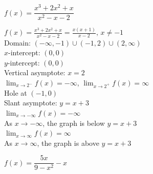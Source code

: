 \documentclass{ximera}
\begin{document}
\begin{question}
\begin{problem}
\begin{solution}
\begin{center} 
\end{center}
\end{solution}
\end{problem} 

\begin{problem}
$f(x) = \dfrac{x^3+2x^2+x}{x^2-x-2}$

\begin{solution}
$f(x) = \frac{x^3+2x^2+x}{x^{2} -x-2} = \frac{x(x+1)}{x - 2}, \, x \neq -1$\\
Domain: $(-\infty, -1) \cup (-1, 2) \cup (2, \infty)$\\
$x$-intercept:  $(0,0)$\\
$y$-intercept:  $(0,0)$\\
Vertical asymptote: $x = 2$\\
$\lim_{x \rightarrow 2^{-}} f(x) = -\infty$, $\lim_{x \rightarrow 2^{+}} f(x) = \infty$\\
Hole at $(-1,0)$ \\
Slant asymptote: $y = x+3$ \\
$\lim_{x \rightarrow -\infty} f(x) = -\infty$\\
As $x \rightarrow -\infty$, the graph is below $y=x+3$ \\
$\lim_{x \rightarrow \infty} f(x) = \infty$\\
As $x \rightarrow \infty$, the graph is above $y=x+3$\\

\begin{center} 
\end{center}
\end{solution}
\end{problem}  

\begin{problem}
$f(x) = \dfrac{5x}{9-x^2} - x$


\end{problem}
\end{question}
\end{document}
